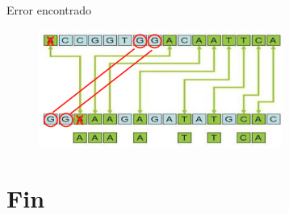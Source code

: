 \documentclass{beamer}
\begin{document}
				\begin{frame}{Error encontrado}
 			
				
					\begin{figure}
						\includegraphics[width=8cm]{../res/imagen_correct.png}
					\caption{}
					
					\end{figure}
				\end{frame}



\section{Fin}
\end{document}
